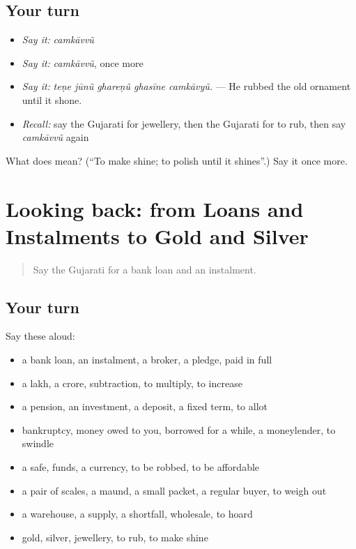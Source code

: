 \subsection*{Your turn}
\begin{itemize}
\raggedright
  \item \emph{Say it:} \emph{camkāvvũ}
  \item \emph{Say it:} \emph{camkāvvũ}, once more
  \item \emph{Say it:} \emph{teṇe jūnũ ghareṇũ ghasīne camkāvyũ.} — He rubbed the old ornament until it shone.
  \item \emph{Recall:} say the Gujarati for jewellery, then the Gujarati for to rub, then say \emph{camkāvvũ} again
\end{itemize}

\begin{tcolorbox}[breakable,colback=teal!4,colframe=teal!35!black,title={Before you move on}]
What does  mean? (\textquotedblleft{}To make shine; to polish until it shines\textquotedblright{}.) Say it once more.
\end{tcolorbox}
\section[(dialogue)]{Looking back: from Loans and Instalments to Gold and Silver}

\label{lesson:GU-R432-review-425-432}



\begin{quote}
Say the Gujarati for a bank loan and an instalment.
\end{quote}

\subsection*{Your turn}
Say these aloud:

\begin{itemize}
\raggedright
  \item a bank loan, an instalment, a broker, a pledge, paid in full
  \item a lakh, a crore, subtraction, to multiply, to increase
  \item a pension, an investment, a deposit, a fixed term, to allot
  \item bankruptcy, money owed to you, borrowed for a while, a moneylender, to swindle
  \item a safe, funds, a currency, to be robbed, to be affordable
  \item a pair of scales, a maund, a small packet, a regular buyer, to weigh out
  \item a warehouse, a supply, a shortfall, wholesale, to hoard
  \item gold, silver, jewellery, to rub, to make shine
\end{itemize}

